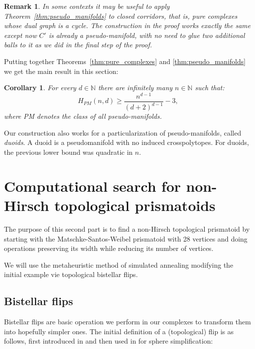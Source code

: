\documentclass[12pt,a4paper]{article}
\newcommand{\N}{\mathbb N}
\theoremstyle{plain}
\newtheorem{corollary}{Corollary}
\newtheorem*{remark}{Remark}
\theoremstyle{definition}
\begin{document}
\begin{remark}
\label{rem:closed-corridor}
In some contexts it may be useful to apply Theorem~\ref{thm:pseudo_manifolds} to \emph{closed corridors}, that is, pure complexes whose dual graph is a cycle. The construction in the proof works exactly the same except now $C'$ is already a pseudo-manifold, with no need to glue two additional balls to it as we did in the final step of the proof.
\end{remark}

Putting together Theorems~\ref{thm:pure_complexes} and \ref{thm:pseudo_manifolds} we get the main result in this section:

\begin{corollary}
\label{coro:pseudo_manifolds}
For every $d\in \N$ there are infinitely many $n\in\N$ such that:
\[
  H_{PM}(n,d) \ge \frac{n^{d-1}}{(d+2)^{d-1}}-3,
\]
where PM denotes the class of all pseudo-manifolds.
\end{corollary}

Our construction also works for a particularization of pseudo-manifolds, called \emph{duoids}\cite{Todd:duoids}. A duoid is a pseudomanifold with no induced crosspolytopes. For duoids, the previous lower bound was quadratic in $n$.

\section{ Computational search for non-Hirsch topological prismatoids}
\label{sec:prismatoids}
The purpose of this second part is to find a non-Hirsch topological prismatoid by starting with the Matschke-Santos-Weibel prismatoid with 28 vertices and doing operations preserving its width while reducing its number of vertices.

We will use the metaheuristic method of simulated annealing modifying the initial example vie topological bistellar flips.

\subsection{Bistellar flips}
Bistellar flips are basic operation we perform in our complexes to transform them into hopefully simpler ones. The initial definition of a (topological) flip is as follows, first introduced in  \cite{Pachner} and then used in \cite{Lutz} for sphere simplification:
\end{document}
